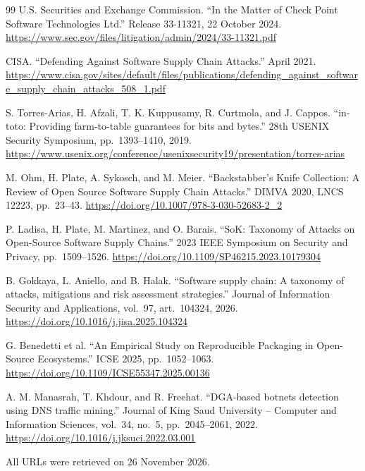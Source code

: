 \begin{thebibliography}{99}
 U.S. Securities and Exchange Commission. ``In the Matter of Check Point Software Technologies Ltd.'' Release 33-11321, 22 October 2024. \url{https://www.sec.gov/files/litigation/admin/2024/33-11321.pdf}

 CISA. ``Defending Against Software Supply Chain Attacks.'' April 2021. \url{https://www.cisa.gov/sites/default/files/publications/defending_against_software_supply_chain_attacks_508_1.pdf}

 S. Torres-Arias, H. Afzali, T. K. Kuppusamy, R. Curtmola, and J. Cappos. ``in-toto: Providing farm-to-table guarantees for bits and bytes.'' 28th USENIX Security Symposium, pp.~1393--1410, 2019. \url{https://www.usenix.org/conference/usenixsecurity19/presentation/torres-arias}

 M. Ohm, H. Plate, A. Sykosch, and M. Meier. ``Backstabber's Knife Collection: A Review of Open Source Software Supply Chain Attacks.'' DIMVA 2020, LNCS 12223, pp.~23--43. \url{https://doi.org/10.1007/978-3-030-52683-2_2}

 P. Ladisa, H. Plate, M. Martinez, and O. Barais. ``SoK: Taxonomy of Attacks on Open-Source Software Supply Chains.'' 2023 IEEE Symposium on Security and Privacy, pp.~1509--1526. \url{https://doi.org/10.1109/SP46215.2023.10179304}

 B. Gokkaya, L. Aniello, and B. Halak. ``Software supply chain: A taxonomy of attacks, mitigations and risk assessment strategies.'' Journal of Information Security and Applications, vol.~97, art.~104324, 2026. \url{https://doi.org/10.1016/j.jisa.2025.104324}

 G. Benedetti et al. ``An Empirical Study on Reproducible Packaging in Open-Source Ecosystems.'' ICSE 2025, pp.~1052--1063. \url{https://doi.org/10.1109/ICSE55347.2025.00136}

 A. M. Manasrah, T. Khdour, and R. Freehat. ``DGA-based botnets detection using DNS traffic mining.'' Journal of King Saud University -- Computer and Information Sciences, vol.~34, no.~5, pp.~2045--2061, 2022. \url{https://doi.org/10.1016/j.jksuci.2022.03.001}

\end{thebibliography}

\vspace{6pt}
\noindent\footnotesize All URLs were retrieved on 26 November 2026.

